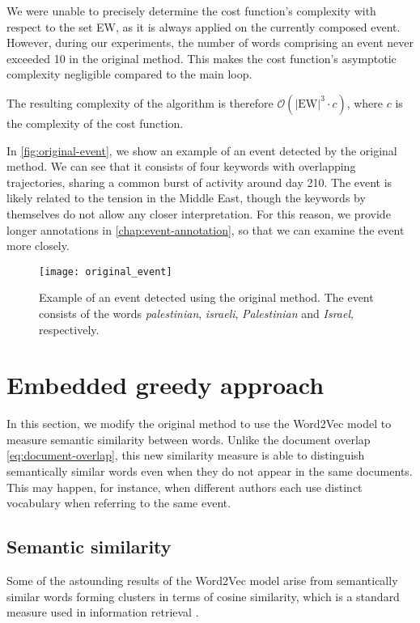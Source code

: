 We were unable to precisely determine the cost function's complexity with respect to the set EW, as it is always applied on the currently composed event. However, during our experiments, the number of words comprising an event never exceeded 10 in the original method. This makes the cost function's asymptotic complexity negligible compared to the main loop.

The resulting complexity of the algorithm is therefore $\mathcal{O}(|\text{EW}|^{3} \cdot c)$, where $c$ is the complexity of the cost function.


In \autoref{fig:original-event}, we show an example of an event detected by the original method. We can see that it consists of four keywords with overlapping trajectories, sharing a common burst of activity around day 210. The event is likely related to the tension in the Middle East, though the keywords by themselves do not allow any closer interpretation. For this reason, we provide longer annotations in \autoref{chap:event-annotation}, so that we can examine the event more closely.


\begin{figure}
  \centering
  \texttt{[image: original\_event]}  %
  \caption{Example of an event detected using the original method. The event consists of the words \textit{palestinian}, \textit{israeli}, \textit{Palestinian} and \textit{Israel}, respectively.}
  \label{fig:original-event}
\end{figure}


\section{Embedded greedy approach}
In this section, we modify the original method to use the Word2Vec model to measure semantic similarity between words. Unlike the document overlap \eqref{eq:document-overlap}, this new similarity measure is able to distinguish semantically similar words even when they do not appear in the same documents. This may happen, for instance, when different authors each use distinct vocabulary when referring to the same event.


\subsection{Semantic similarity}
Some of the astounding results of the Word2Vec model arise from semantically similar words forming clusters \citep{linguistic-regularities} in terms of cosine similarity, which is a standard measure used in information retrieval \citep{information-retrieval, cosine-similarity}.

